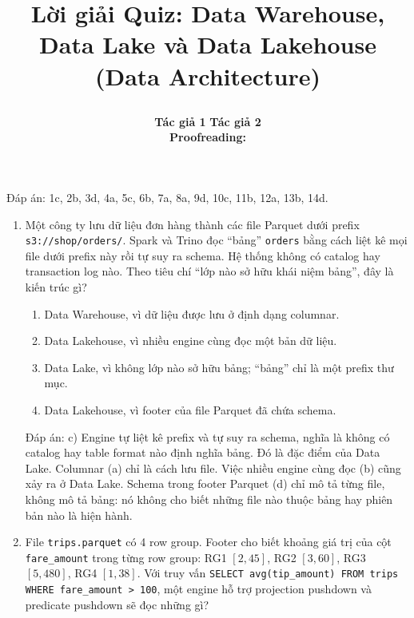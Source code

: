 \documentclass[12pt]{article}
\title{%
  \parbox[c][\TitleBlockHeight][c]{0.90\textwidth}{%
    \centering
    {\fontsize{20pt}{24pt}\selectfont\bfseries Lời giải Quiz: Data Warehouse,\\ Data Lake và Data Lakehouse}\\[6pt]
    {\fontsize{13pt}{15pt}\selectfont (Data Architecture)}
  }%
}
\author{%
  \textbf{Tác giả 1}
  \hspace{2.8em}
  \textbf{Tác giả 2}\\
  \vspace{1em}
  \textbf{Proofreading: }
}
\date{}
\begin{document}
\maketitle
\thispagestyle{firstpage}
\vspace{-3em}
\noindent Đáp án: 1c, 2b, 3d, 4a, 5c, 6b, 7a, 8a, 9d, 10c, 11b, 12a, 13b, 14d.

\begin{enumerate}[label=\textbf{\arabic*.}, leftmargin=1.6em, itemsep=1.2em]
\item Một công ty lưu dữ liệu đơn hàng thành các file Parquet dưới prefix \texttt{s3://shop/orders/}. Spark và Trino đọc ``bảng'' \texttt{orders} bằng cách liệt kê mọi file dưới prefix này rồi tự suy ra schema. Hệ thống không có catalog hay transaction log nào. Theo tiêu chí ``lớp nào sở hữu khái niệm bảng'', đây là kiến trúc gì?

\begin{enumerate}[label=\alph*), leftmargin=2.2em, itemsep=1pt]
    \item Data Warehouse, vì dữ liệu được lưu ở định dạng columnar.
    \item Data Lakehouse, vì nhiều engine cùng đọc một bản dữ liệu.
    \item Data Lake, vì không lớp nào sở hữu bảng; ``bảng'' chỉ là một prefix thư mục.
    \item Data Lakehouse, vì footer của file Parquet đã chứa schema.
\end{enumerate}
\begin{guidelinebox}{Đáp án: c)}
Engine tự liệt kê prefix và tự suy ra schema, nghĩa là không có catalog hay table format nào định nghĩa bảng. Đó là đặc điểm của Data Lake. Columnar (a) chỉ là cách lưu file. Việc nhiều engine cùng đọc (b) cũng xảy ra ở Data Lake. Schema trong footer Parquet (d) chỉ mô tả từng file, không mô tả bảng: nó không cho biết những file nào thuộc bảng hay phiên bản nào là hiện hành.
\end{guidelinebox}

\item File \texttt{trips.parquet} có 4 row group. Footer cho biết khoảng giá trị của cột \texttt{fare\_amount} trong từng row group: RG1 $[2, 45]$, RG2 $[3, 60]$, RG3 $[5, 480]$, RG4 $[1, 38]$. Với truy vấn \texttt{SELECT avg(tip\_amount) FROM trips WHERE fare\_amount > 100}, một engine hỗ trợ projection pushdown và predicate pushdown sẽ đọc những gì?


\end{enumerate}
\end{document}
